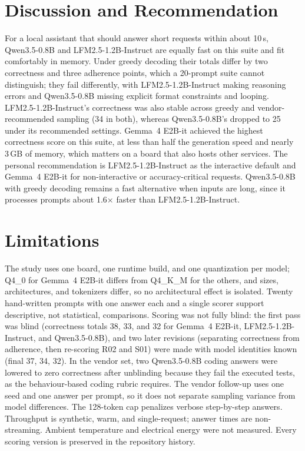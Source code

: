 \documentclass[conference]{IEEEtran}
\newcommand{\qwen}{Qwen3.5-0.8B}
\newcommand{\lfm}{LFM2.5-1.2B-Instruct}
\newcommand{\gemma}{Gemma~4 E2B-it}
\begin{document}
\section{Discussion and Recommendation}
For a local assistant that should answer short requests within about 10\,s, \qwen{} and \lfm{} are equally fast on this suite and fit comfortably in memory. Under greedy decoding their totals differ by two correctness and three adherence points, which a 20-prompt suite cannot distinguish; they fail differently, with \lfm{} making reasoning errors and \qwen{} missing explicit format constraints and looping. \lfm{}'s correctness was also stable across greedy and vendor-recommended sampling (34 in both), whereas \qwen{}'s dropped to 25 under its recommended settings. \gemma{} achieved the highest correctness score on this suite, at less than half the generation speed and nearly 3\,GB of memory, which matters on a board that also hosts other services. The personal recommendation is \lfm{} as the interactive default and \gemma{} for non-interactive or accuracy-critical requests. \qwen{} with greedy decoding remains a fast alternative when inputs are long, since it processes prompts about 1.6$\times$ faster than \lfm{}.

\section{Limitations}
The study uses one board, one runtime build, and one quantization per model; Q4\_0 for \gemma{} differs from Q4\_K\_M for the others, and sizes, architectures, and tokenizers differ, so no architectural effect is isolated. Twenty hand-written prompts with one answer each and a single scorer support descriptive, not statistical, comparisons. Scoring was not fully blind: the first pass was blind (correctness totals 38, 33, and 32 for \gemma{}, \lfm{}, and \qwen{}), and two later revisions (separating correctness from adherence, then re-scoring R02 and S01) were made with model identities known (final 37, 34, 32). In the vendor set, two \qwen{} coding answers were lowered to zero correctness after unblinding because they fail the executed tests, as the behaviour-based coding rubric requires. The vendor follow-up uses one seed and one answer per prompt, so it does not separate sampling variance from model differences. The 128-token cap penalizes verbose step-by-step answers. Throughput is synthetic, warm, and single-request; answer times are non-streaming. Ambient temperature and electrical energy were not measured. Every scoring version is preserved in the repository history.
\end{document}
